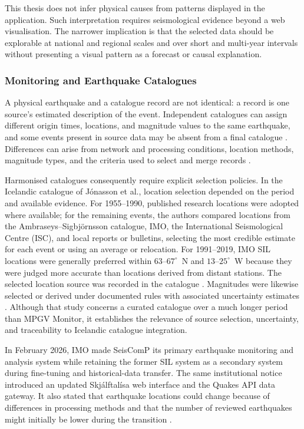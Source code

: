 \documentclass[12pt]{article}
\begin{document}
This thesis does not infer physical causes from patterns displayed in the application. Such interpretation requires seismological evidence beyond a web visualisation. The narrower implication is that the selected data should be explorable at national and regional scales and over short and multi-year intervals without presenting a visual pattern as a forecast or causal explanation.

\subsubsection{Monitoring and Earthquake Catalogues}

A physical earthquake and a catalogue record are not identical: a record is one source's estimated description of the event. Independent catalogues can assign different origin times, locations, and magnitude values to the same earthquake, and some events present in source data may be absent from a final catalogue \cite[p.~2202]{Jonasson2021}. Differences can arise from network and processing conditions, location methods, magnitude types, and the criteria used to select and merge records \cite[p.~2599]{Poggi2024}.

Harmonised catalogues consequently require explicit selection policies. In the Icelandic catalogue of J\'onasson et al., location selection depended on the period and available evidence. For 1955--1990, published research locations were adopted where available; for the remaining events, the authors compared locations from the Ambraseys--Sigbj\"ornsson catalogue, IMO, the International Seismological Centre (ISC), and local reports or bulletins, selecting the most credible estimate for each event or using an average or relocation. For 1991--2019, IMO SIL locations were generally preferred within $63$--$67^{\circ}$~N and $13$--$25^{\circ}$~W because they were judged more accurate than locations derived from distant stations. The selected location source was recorded in the catalogue \cite[p.~2203, Sections~3.1--3.2]{Jonasson2021}. Magnitudes were likewise selected or derived under documented rules with associated uncertainty estimates \cite[pp.~2204--2207]{Jonasson2021}. Although that study concerns a curated catalogue over a much longer period than MPGV Monitor, it establishes the relevance of source selection, uncertainty, and traceability to Icelandic catalogue integration.

In February 2026, IMO made SeisComP its primary earthquake monitoring and analysis system while retaining the former SIL system as a secondary system during fine-tuning and historical-data transfer. The same institutional notice introduced an updated Skj\'alftal\'isa web interface and the Quakes API data gateway. It also stated that earthquake locations could change because of differences in processing methods and that the number of reviewed earthquakes might initially be lower during the transition \cite{imo_seiscomp_2026}.
\end{document}
